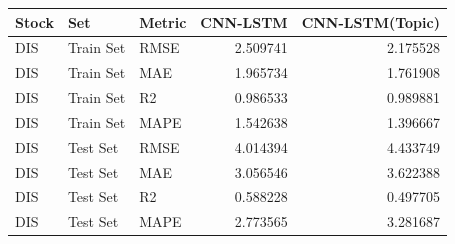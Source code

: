 \begin{tabular}{lllrr}
\toprule
Stock & Set & Metric & CNN-LSTM & CNN-LSTM(Topic) \\
\midrule
DIS & Train Set & RMSE & 2.509741 & 2.175528 \\
DIS & Train Set & MAE & 1.965734 & 1.761908 \\
DIS & Train Set & R2 & 0.986533 & 0.989881 \\
DIS & Train Set & MAPE & 1.542638 & 1.396667 \\
DIS & Test Set & RMSE & 4.014394 & 4.433749 \\
DIS & Test Set & MAE & 3.056546 & 3.622388 \\
DIS & Test Set & R2 & 0.588228 & 0.497705 \\
DIS & Test Set & MAPE & 2.773565 & 3.281687 \\
\bottomrule
\end{tabular}
